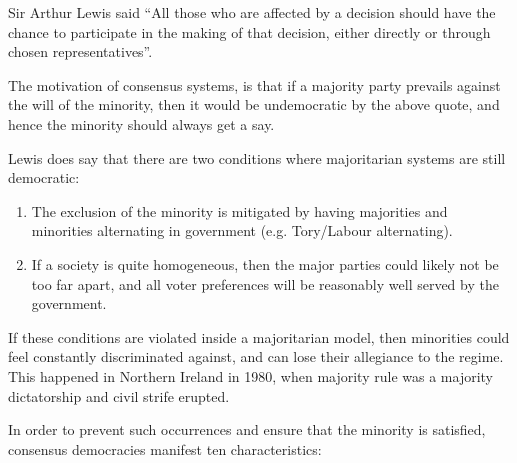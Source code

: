 
Sir Arthur Lewis said ``All those who are affected by a decision
should have the chance to participate in the making of that decision,
either directly or through chosen representatives''.

The motivation of consensus systems, is that if a majority party
prevails against the will of the minority, then it would be
undemocratic by the above quote, and hence the minority should always
get a say.

Lewis does say that there are two conditions where majoritarian
systems are still democratic:


\begin{enumerate}
  \item The exclusion of the minority is mitigated by having majorities
    and minorities alternating in government (e.g. Tory/Labour
    alternating).
  \item If a society is quite homogeneous, then the major parties
    could likely not be too far apart, and all voter preferences will
    be reasonably well served by the government.
\end{enumerate}

If these conditions are violated inside a majoritarian model, then
minorities could feel constantly discriminated against, and can lose
their allegiance to the regime. This happened in Northern Ireland in
1980, when majority rule was a majority dictatorship and civil strife
erupted.

In order to prevent such occurrences and ensure that the minority is
satisfied, consensus democracies manifest ten characteristics:


